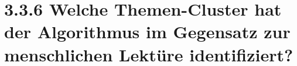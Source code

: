 \documentclass[
  12pt,
  letterpaper,
  DIV=11,
  numbers=noendperiod]{scrreprt}
\begin{document}

\chapter{}\label{section}


\chapter{}\label{section-1}


\chapter{3.3.6 Welche Themen-Cluster hat der Algorithmus im Gegensatz
zur menschlichen Lektüre
identifiziert?}\label{welche-themen-cluster-hat-der-algorithmus-im-gegensatz-zur-menschlichen-lektuxfcre-identifiziert}
\end{document}
